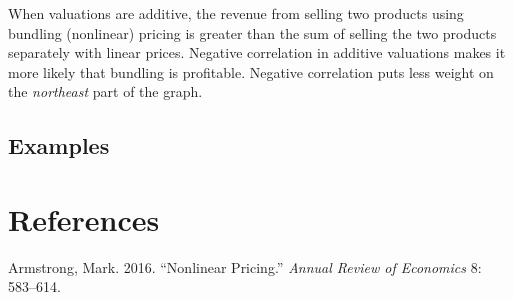 \documentclass[
]{article}
\newlength{\cslhangindent}
\newenvironment{CSLReferences}[2] %
 {\begin{list}{}{%
  \setlength{\itemindent}{0pt}
  \setlength{\leftmargin}{0pt}
  \setlength{\parsep}{0pt}
  \ifodd #1
   \setlength{\leftmargin}{\cslhangindent}
   \setlength{\itemindent}{-1\cslhangindent}
  \fi
  \setlength{\itemsep}{#2\baselineskip}}}
 {\end{list}}
\begin{document}
When valuations are additive, the revenue from selling two products
using bundling (nonlinear) pricing is greater than the sum of selling
the two products separately with linear prices. Negative correlation in
additive valuations makes it more likely that bundling is profitable.
Negative correlation puts less weight on the \emph{northeast} part of
the graph.

\subsection{Examples}\label{examples}

\section*{References}\label{references}

\label{refs}
\begin{CSLReferences}{1}{0}
Armstrong, Mark. 2016. {``Nonlinear Pricing.''} \emph{Annual Review of
Economics} 8: 583--614.

\end{CSLReferences}
\end{document}
